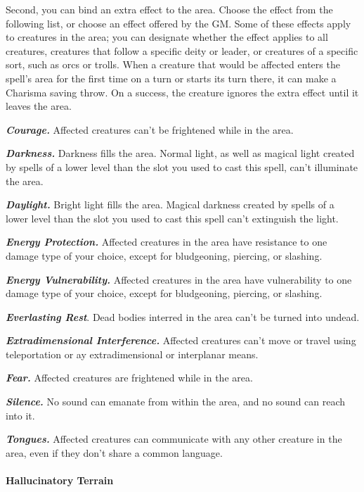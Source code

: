 \documentclass[
]{article}
\begin{document}
Second, you can bind an extra effect to the area. Choose the effect from
the following list, or choose an effect offered by the GM. Some of these
effects apply to creatures in the area; you can designate whether the
effect applies to all creatures, creatures that follow a specific deity
or leader, or creatures of a specific sort, such as orcs or trolls. When
a creature that would be affected enters the spell's area for the first
time on a turn or starts its turn there, it can make a Charisma saving
throw. On a success, the creature ignores the extra effect until it
leaves the area.

\emph{\textbf{Courage.}} Affected creatures can't be frightened while in
the area.

\emph{\textbf{Darkness.}} Darkness fills the area. Normal light, as well
as magical light created by spells of a lower level than the slot you
used to cast this spell, can't illuminate the area.

\emph{\textbf{Daylight.}} Bright light fills the area. Magical darkness
created by spells of a lower level than the slot you used to cast this
spell can't extinguish the light.

\emph{\textbf{Energy Protection.}} Affected creatures in the area have
resistance to one damage type of your choice, except for bludgeoning,
piercing, or slashing.

\emph{\textbf{Energy Vulnerability.}} Affected creatures in the area
have vulnerability to one damage type of your choice, except for
bludgeoning, piercing, or slashing.

\emph{\textbf{Everlasting Rest}}. Dead bodies interred in the area can't
be turned into undead.

\emph{\textbf{Extradimensional Interference.}} Affected creatures can't
move or travel using teleportation or ay extradimensional or interplanar
means.

\emph{\textbf{Fear.}} Affected creatures are frightened while in the
area.

\emph{\textbf{Silence.}} No sound can emanate from within the area, and
no sound can reach into it.

\emph{\textbf{Tongues.}} Affected creatures can communicate with any
other creature in the area, even if they don't share a common language.

\hypertarget{hallucinatory-terrain}{%
\paragraph{Hallucinatory Terrain}\label{hallucinatory-terrain}}
\end{document}
